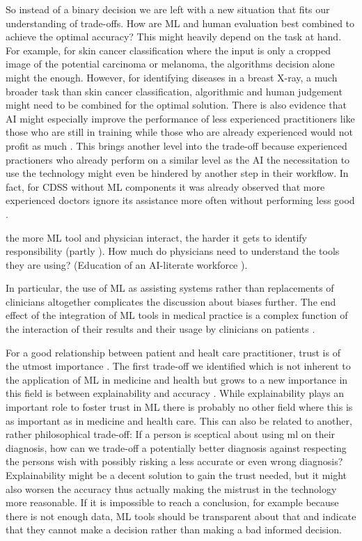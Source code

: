 So instead of a binary decision we are left with a new situation that fits our understanding of trade-offs. How are ML and human evaluation best combined to achieve the optimal accuracy? This might heavily depend on the task at hand. For example, for skin cancer classification where the input is only a cropped image of the potential carcinoma or melanoma, the algorithms decision alone might the enough. However, for identifying diseases in a breast X-ray, a much broader task than skin cancer classification, algorithmic and human judgement might need to be combined for the optimal solution.
There is also evidence that AI might especially improve the performance of less experienced practitioners like those who are still in training while those who are already experienced would not profit as much \cite{rajpurkar2022ai}. This brings another level into the trade-off because experienced practioners who already perform on a similar level as the AI the necessitation to use the technology might even be hindered by another step in their workflow. In fact, for CDSS without ML components it was already observed that more experienced doctors ignore its assistance more often without performing less good \cite{sutton2020overview}.

the more ML tool and physician interact, the harder it gets to identify responsibility (partly \cite{horgan2019artificial}).
How much do physicians need to understand the tools they are using? (Education of an AI-literate workforce \cite{he2019practical}).


In particular, the use of ML as assisting systems rather than replacements of clinicians altogether complicates the discussion about biases further.
The end effect of the integration of ML tools in medical practice is a complex function of the interaction of their results and their usage by clinicians on patients \cite[p.~4]{Rajkomar2018}.


For a good relationship between patient and healt care practitioner, trust is of the utmost importance \cite{clark2002trust}. 
The first trade-off we identified which is not inherent to the application of ML in medicine and health but grows to a new importance in this field is between explainability and accuracy \cite{topol2019high, kelly2019key}. While explainability plays an important role to foster trust in ML there is probably no other field where this is as important as in medicine and health care. This can also be related to another, rather philosophical trade-off: If a person is sceptical about using ml on their diagnosis, how can we trade-off a potentially better diagnosis against respecting the persons wish with possibly risking a less accurate or even wrong diagnosis? Explainability might be a decent solution to gain the trust needed, but it might also worsen the accuracy thus actually making the mistrust in the technology more reasonable.
If it is impossible to reach a conclusion, for example because there is not enough data, ML tools should be transparent about that and indicate that they cannot make a decision rather than making a bad informed decision.  \cite{horgan2019artificial}


